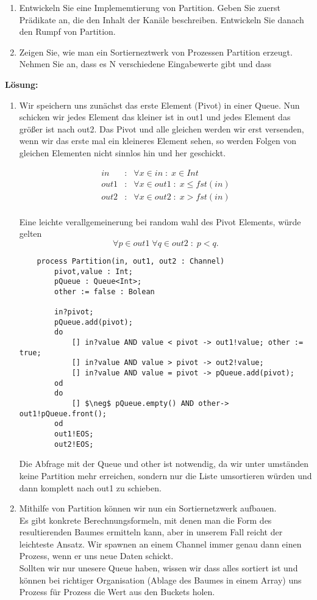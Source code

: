 \documentclass[ngerman,a4paper,11pt]{article}
\begin{document}
\begin{enumerate}[1.]
	\item Entwickeln Sie eine Implememtierung von Partition. Geben Sie zuerst Prädikate an, die
		den Inhalt der Kanäle beschreiben. Entwickeln Sie danach den Rumpf von Partition.
	\item Zeigen Sie, wie man ein Sortierneztwerk von Prozessen Partition erzeugt. Nehmen Sie an,
		dass es N verschiedene Eingabewerte gibt und dass
\end{enumerate}

\textbf{Lösung:}\\
\begin{enumerate}[1.]
	\item Wir speichern uns zunächst das erste Element (Pivot) in einer Queue. Nun schicken wir jedes Element
		das kleiner ist in out1 und jedes Element das größer ist nach out2. Das Pivot und alle gleichen werden wir
		erst versenden, wenn wir das erste mal ein kleineres Element sehen, so werden Folgen von gleichen Elementen
		nicht sinnlos hin und her geschickt.

		$$\begin{array}{rcl}
			in &:& \forall x \in in \; : \; x \in Int\\
			out1 &:& \forall x \in out1 \; : \; x \leq fst(in)\\
			out2 &:& \forall x \in out2 \; : \; x > fst(in)\\
		\end{array}$$

		Eine leichte verallgemeinerung bei random wahl des Pivot Elements, würde gelten
		$$
			\forall p \in out1 \; \forall q \in out2 \; : \; p < q.
		$$
\begin{lstlisting}
	process Partition(in, out1, out2 : Channel)
		pivot,value : Int;
		pQueue : Queue<Int>;
		other := false : Bolean
		
		in?pivot;
		pQueue.add(pivot);
		do
			[] in?value AND value < pivot -> out1!value; other := true;
			[] in?value AND value > pivot -> out2!value;
			[] in?value AND value = pivot -> pQueue.add(pivot);
		od
		do
			[] $\neg$ pQueue.empty() AND other-> out1!pQueue.front();
		od
		out1!EOS;
		out2!EOS;
\end{lstlisting}
	Die Abfrage mit der Queue und other ist notwendig, da wir unter umständen keine Partition mehr erreichen, sondern
	nur die Liste umsortieren würden und dann komplett nach out1 zu schieben.

	\item Mithilfe von Partition können wir nun ein Sortiernetzwerk aufbauen.\\
		Es gibt konkrete Berechnungsformeln, mit denen man die Form des resultierenden Baumes
		ermitteln kann, aber in unserem Fall reicht der leichteste Ansatz. Wir
		spawnen an einem Channel immer genau dann einen Prozess, wenn er uns neue Daten schickt.\\
		Sollten wir nur unesere Queue haben, wissen wir dass alles sortiert ist und können bei richtiger Organisation
		(Ablage des Baumes in einem Array) uns Prozess für Prozess die Wert aus den Buckets holen.\\


\end{enumerate}
\end{document}
